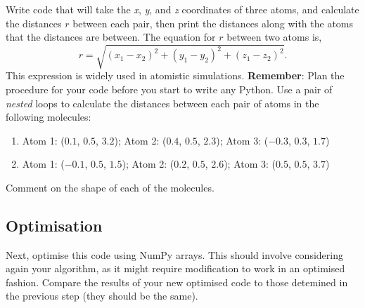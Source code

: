 \documentclass[a4paper]{article}
\begin{document}
Write code that will take the \emph{x}, \emph{y}, and \emph{z} coordinates of three atoms, and calculate the distances $r$ between each pair, then print the distances along with the atoms that the distances are between.
The equation for $r$ between two atoms is,
\begin{equation}
	r = \sqrt{(x_1 - x_2)^2 + (y_1 - y_2)^2 + (z_1 - z_2)^2}.
\end{equation}
This expression is widely used in atomistic simulations.
\textbf{Remember}: Plan the procedure for your code before you start to write any Python.
Use a pair of \emph{nested} loops to calculate the distances between each pair of atoms in the following molecules:
\begin{enumerate}
	\item{Atom 1: ($0.1$, $0.5$, $3.2$); Atom 2: ($0.4$, $0.5$, $2.3$); Atom 3: ($-0.3$, $0.3$, $1.7$)}
	\item{Atom 1: ($-0.1$, $0.5$, $1.5$); Atom 2: ($0.2$, $0.5$, $2.6$); Atom 3: ($0.5$, $0.5$, $3.7$)}
\end{enumerate}
Comment on the shape of each of the molecules.

\subsection{Optimisation}

Next, optimise this code using NumPy arrays.
This should involve considering again your algorithm, as it might require modification to work in an optimised fashion.
Compare the results of your new optimised code to those detemined in the previous step (they should be the same).



\end{document}
